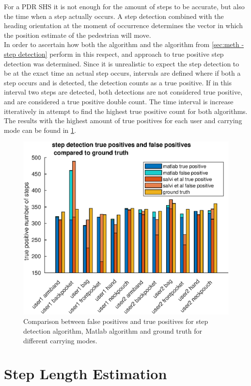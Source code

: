 For a PDR SHS it is not enough for the amount of steps to be accurate, but also the time when a step actually occurs. A step detection combined with the heading orientation at the moment of occurrence determines the vector in which the position estimate of the pedestrian will move. \\
In order to ascertain how both the \citet{Salvi2018} algorithm and the algorithm from \cref{sec:meth - step detection} perform in this respect, and approach to true positive step detection was determined. Since it is unrealistic to expect the step detection to be at the exact time an actual step occurs, intervals are defined where if both a step occurs and is detected, the detection counts as a true positive. If in this interval two steps are detected, both detections are not considered true positive, and are considered a true positive double count. The time interval is increase itteratively in attempt to find the highest true positive count for both algorithms. The results with the highest amount of true positives for each user and carrying mode can be found in \cref{fig:sd_tp_fp_comparison}. 
\begin{figure}[H]
	\centering
	\includegraphics[width=0.7\linewidth]{images/20200930_1510_tp_fp_abs_comparison}
\caption[False positives and true positives step detection comparison]{Comparison between false positives and true positives for \citet{Salvi2018} step detection algorithm, Matlab algorithm and ground truth for different carrying modes.}
\label{fig:sd_tp_fp_comparison}
\end{figure}

\newpage

\section{Step Length Estimation}


